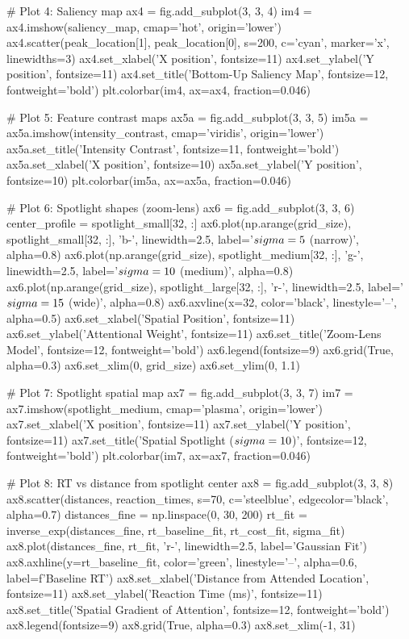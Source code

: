 \documentclass[a4paper, 11pt]{article}
\begin{document}
\begin{pycode}
# Plot 4: Saliency map
ax4 = fig.add_subplot(3, 3, 4)
im4 = ax4.imshow(saliency_map, cmap='hot', origin='lower')
ax4.scatter(peak_location[1], peak_location[0], s=200, c='cyan', marker='x', linewidths=3)
ax4.set_xlabel('X position', fontsize=11)
ax4.set_ylabel('Y position', fontsize=11)
ax4.set_title('Bottom-Up Saliency Map', fontsize=12, fontweight='bold')
plt.colorbar(im4, ax=ax4, fraction=0.046)

# Plot 5: Feature contrast maps
ax5a = fig.add_subplot(3, 3, 5)
im5a = ax5a.imshow(intensity_contrast, cmap='viridis', origin='lower')
ax5a.set_title('Intensity Contrast', fontsize=11, fontweight='bold')
ax5a.set_xlabel('X position', fontsize=10)
ax5a.set_ylabel('Y position', fontsize=10)
plt.colorbar(im5a, ax=ax5a, fraction=0.046)

# Plot 6: Spotlight shapes (zoom-lens)
ax6 = fig.add_subplot(3, 3, 6)
center_profile = spotlight_small[32, :]
ax6.plot(np.arange(grid_size), spotlight_small[32, :], 'b-', linewidth=2.5,
         label='$\\sigma=5$ (narrow)', alpha=0.8)
ax6.plot(np.arange(grid_size), spotlight_medium[32, :], 'g-', linewidth=2.5,
         label='$\\sigma=10$ (medium)', alpha=0.8)
ax6.plot(np.arange(grid_size), spotlight_large[32, :], 'r-', linewidth=2.5,
         label='$\\sigma=15$ (wide)', alpha=0.8)
ax6.axvline(x=32, color='black', linestyle='--', alpha=0.5)
ax6.set_xlabel('Spatial Position', fontsize=11)
ax6.set_ylabel('Attentional Weight', fontsize=11)
ax6.set_title('Zoom-Lens Model', fontsize=12, fontweight='bold')
ax6.legend(fontsize=9)
ax6.grid(True, alpha=0.3)
ax6.set_xlim(0, grid_size)
ax6.set_ylim(0, 1.1)

# Plot 7: Spotlight spatial map
ax7 = fig.add_subplot(3, 3, 7)
im7 = ax7.imshow(spotlight_medium, cmap='plasma', origin='lower')
ax7.set_xlabel('X position', fontsize=11)
ax7.set_ylabel('Y position', fontsize=11)
ax7.set_title('Spatial Spotlight ($\\sigma=10$)', fontsize=12, fontweight='bold')
plt.colorbar(im7, ax=ax7, fraction=0.046)

# Plot 8: RT vs distance from spotlight center
ax8 = fig.add_subplot(3, 3, 8)
ax8.scatter(distances, reaction_times, s=70, c='steelblue', edgecolor='black', alpha=0.7)
distances_fine = np.linspace(0, 30, 200)
rt_fit = inverse_exp(distances_fine, rt_baseline_fit, rt_cost_fit, sigma_fit)
ax8.plot(distances_fine, rt_fit, 'r-', linewidth=2.5, label='Gaussian Fit')
ax8.axhline(y=rt_baseline_fit, color='green', linestyle='--', alpha=0.6,
            label=f'Baseline RT')
ax8.set_xlabel('Distance from Attended Location', fontsize=11)
ax8.set_ylabel('Reaction Time (ms)', fontsize=11)
ax8.set_title('Spatial Gradient of Attention', fontsize=12, fontweight='bold')
ax8.legend(fontsize=9)
ax8.grid(True, alpha=0.3)
ax8.set_xlim(-1, 31)


\end{pycode}
\end{document}
